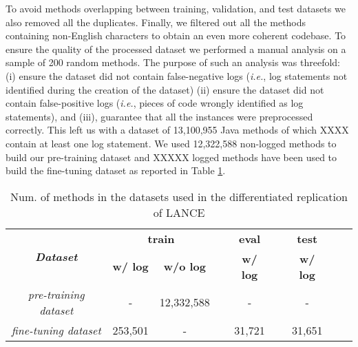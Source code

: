To avoid methods overlapping between training, validation, and test datasets we also removed all the duplicates. 
Finally, we filtered out all the methods containing non-English characters to obtain an even more coherent codebase. 
To ensure the quality of the processed dataset we performed a manual analysis on a sample of 200 random methods. 
The purpose of such an analysis was threefold: (i) ensure  the dataset did not contain false-negative logs (\emph{i.e.}, log statements not identified during the creation of the dataset) (ii) ensure the dataset did not contain false-positive logs (\emph{i.e.}, pieces of code wrongly identified as log statements), and (iii), guarantee that all the instances were preprocessed correctly.
This left us with a dataset of 13,100,955 Java methods of which XXXX contain at least one log statement. We used 12,322,588 non-logged \java methods to build our pre-training dataset and XXXXX logged \java methods have been used to build the fine-tuning dataset as reported in Table \ref{tab:ds-summary-1}. 

\begin{table}[h]
	\centering
	\caption{Num. of methods in the datasets used in the differentiated replication of LANCE}
	\begin{tabular}{ccccccccc}
		\hline
		\multirow{2}{*}{\textit{\textbf{Dataset}}} & \multicolumn{2}{c}{\textbf{train}} & \textbf{} & \textbf{eval} & \textbf{} & \textbf{test}  \\ \cline{2-3} \cline{5-5} \cline{7-7} 
		& \textbf{w/ log} & \textbf{w/o log} & \textbf{} & \textbf{w/ log} & \textbf{} & \textbf{w/ log} \\ \hline
		\textit{pre-training dataset}              & -               &      12,332,588  &           & -               &           &  -               \\
		\textit{fine-tuning dataset}               & 253,501         & -                &           & 31,721          &           & 31,651          \\ \hline
	\end{tabular}
	\label{tab:ds-summary-1}
\end{table}







